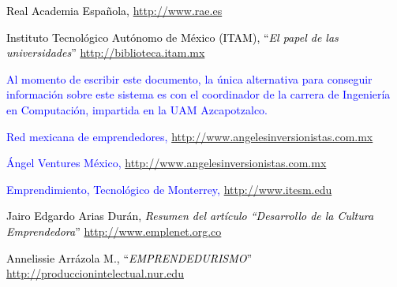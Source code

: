 \documentclass[11pt,letterpaper,titlepage]{article}
\begin{document}
\begin{thebibliography}{99}
 \textcolor{black}{Real Academia Espa\~nola, \href{http://www.rae.es}{http://www.rae.es}}

 \textcolor{black}{Instituto Tecnol\'ogico Aut\'onomo de M\'exico (ITAM), ``\textit{El papel de las universidades}'' \href{http://biblioteca.itam.mx/estudios/estudio/letras39-40/texto10/sec\_2.html}{http://biblioteca.itam.mx} } 

\bibitem{*} \textcolor{blue}{Al momento de escribir este documento, la \'unica alternativa para conseguir informaci\'on sobre este sistema es con el coordinador de la carrera de Ingenier\'ia en Computaci\'on, impartida en la UAM Azcapotzalco.}


 \textcolor{blue}{Red mexicana de emprendedores, \href{http://www.angelesinversionistas.com.mx}{http://www.angelesinversionistas.com.mx}}

 \textcolor{blue}{\'Angel Ventures M\'exico, \href{http://www.angelesinversionistas.com.mx}{http://www.angelesinversionistas.com.mx}}


 \textcolor{blue}{Emprendimiento, Tecnol\'ogico de Monterrey,} \textcolor{blue}{\href{http://www.itesm.edu/wps/wcm/connect/ITESM/Tecnologico+de+Monterrey/Emprendimiento/\#2}{http://www.itesm.edu}}


 \textcolor{black}{Jairo Edgardo Arias Dur\'an, \textit{Resumen del art\'iculo ``Desarrollo de la Cultura Emprendedora}'' \href{http://www.emplenet.org.co/roce/documentos/desarrollo\%20de\%20la\%20cultura\%20emprendedora.pdf}{http://www.emplenet.org.co}}

 \textcolor{black}{Annelissie Arr\'azola M., ``\textit{EMPRENDEDURISMO}'' \href{http://produccionintelectual.nur.edu/archivos/emprendedurismo.pdf}{http://produccionintelectual.nur.edu}}








\end{thebibliography}
\end{document}
